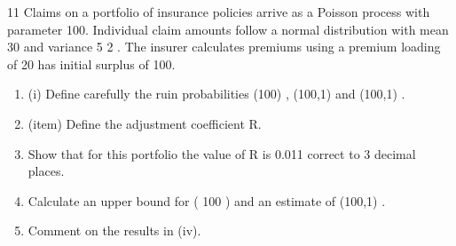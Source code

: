 \documentclass[a4paper,12pt]{article}
\begin{document}
11
Claims on a portfolio of insurance policies arrive as a Poisson process with parameter
100. Individual claim amounts follow a normal distribution with mean 30 and
variance 5 2 . The insurer calculates premiums using a premium loading of 20%
has initial surplus of 100.
\begin{enumerate}
\item (i) Define carefully the ruin probabilities \psi (100) , \psi (100,1) and  (100,1) .

\item (item) Define the adjustment coefficient R.

\item  Show that for this portfolio the value of R is 0.011 correct to 3 decimal places.

\item  Calculate an upper bound for \psi ( 100 ) and an estimate of  (100,1) .
\item Comment on the results in (iv).
\end{enumerate}

\newpage
\end{document}
